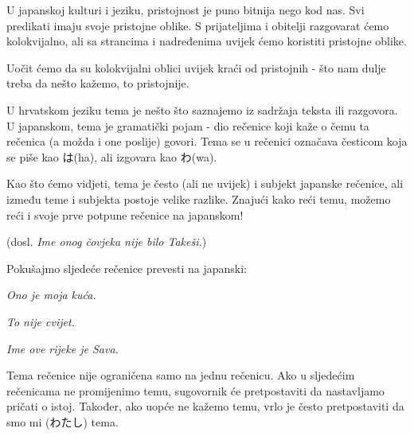 	
	U japanskoj kulturi i jeziku, pristojnost je puno bitnija nego kod nas. Svi predikati imaju svoje pristojne oblike. S prijateljima i obitelji razgovarat ćemo kolokvijalno, ali sa strancima i nadređenima uvijek ćemo koristiti pristojne oblike.
	
	Uočit ćemo da su kolokvijalni oblici uvijek kraći od pristojnih - što nam dulje treba da nešto kažemo, to pristojnije.
	
	
	U hrvatskom jeziku tema je nešto što saznajemo iz sadržaja teksta ili razgovora. U japanskom, tema je gramatički pojam - dio rečenice koji kaže o čemu ta rečenica (a možda i one poslije) govori. Tema se u rečenici označava česticom koja se piše kao は(ha), ali izgovara kao わ(wa)\footnotemark[3].
	
	
	Kao što ćemo vidjeti, tema je često (ali ne uvijek) i subjekt japanske rečenice, ali između teme i subjekta postoje velike razlike. Znajući kako reći temu, možemo reći i svoje prve potpune rečenice na japanskom!
	
	\begin{reibun}
		 (dosl. \textit{Ime onog čovjeka nije bilo Takeši.})
	\end{reibun}

	\begin{mondai}{Pokušajmo sljedeće rečenice prevesti na japanski:}
		\item \textit{Ono je moja kuća.}
		\item \textit{To nije cvijet.}
		\item \textit{Ime ove rijeke je Sava.}
	\end{mondai}

	Tema rečenice nije ograničena samo na jednu rečenicu. Ako u sljedećim rečenicama ne promijenimo temu, sugovornik će pretpostaviti da nastavljamo pričati o istoj. Također, ako uopće ne kažemo temu, vrlo je često pretpostaviti da smo mi (わたし) tema.

	
